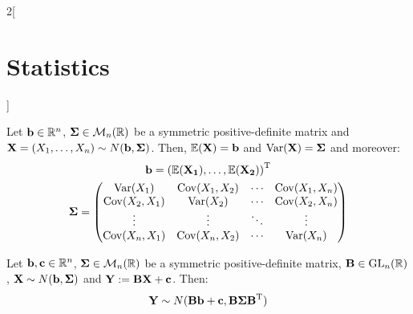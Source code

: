 \documentclass[../../../main.tex]{subfiles}
\begin{document}
\begin{multicols}{2}[\section{Statistics}]
\begin{proposition}
\begin{itemize}
    \end{itemize}
  \end{proposition}
  \begin{proposition}
    Let $\vf{b}\in\RR^n$, $\vf{\Sigma}\in\mathcal{M}_n(\RR)$ be a symmetric positive-definite matrix and $\vf{X}=(X_1,\ldots,X_n)\sim N(\vf{b},\vf\Sigma)$. Then, $\Exp(\vf{X})=\vf{b}$ and $\Var(\vf{X})=\vf\Sigma$ and moreover:
    \begin{gather*}
      \vf{b}=\transpose{(\Exp(X_1),\ldots,\Exp(X_2))}\\
      \vf\Sigma=
      \begin{pmatrix}
        \Var(X_1)     & \cov(X_1,X_2) & \cdots & \cov(X_1,X_n) \\
        \cov(X_2,X_1) & \Var(X_2)     & \cdots & \cov(X_2,X_n) \\
        \vdots        & \vdots        & \ddots & \vdots        \\
        \cov(X_n,X_1) & \cov(X_n,X_2) & \cdots & \Var(X_n)     \\
      \end{pmatrix}
    \end{gather*}
  \end{proposition}
  \begin{proposition}
    Let $\vf{b},\vf{c}\in\RR^n$, $\vf{\Sigma}\in\mathcal{M}_n(\RR)$ be a symmetric positive-definite matrix, $\vf{B}\in\GL_n(\RR)$, $\vf{X}\sim N(\vf{b},\vf\Sigma)$ and $\vf{Y}:=\vf{BX}+\vf{c}$. Then: $$\vf{Y}\sim N(\vf{Bb}+\vf{c},\vf{B\Sigma}\transpose{\vf{B}})$$
  \end{proposition}

\end{multicols}
\end{document}
